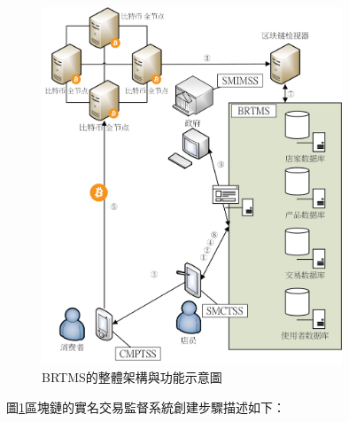 	\begin{figure}[htbp]
		\centering
		\includegraphics[width = 0.8\textwidth]{fig4.png}
		\caption{BRTMS的整體架構與功能示意圖}\label{fig4}
	\end{figure}

	圖\ref{fig4}區塊鏈的實名交易監督系統創建步驟描述如下：

